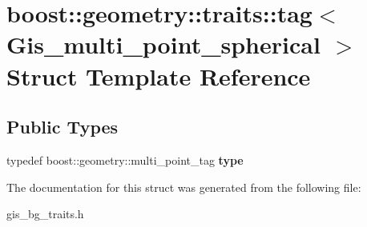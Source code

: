 \hypertarget{structboost_1_1geometry_1_1traits_1_1tag_3_01Gis__multi__point__spherical_01_4}{}\section{boost\+:\+:geometry\+:\+:traits\+:\+:tag$<$ Gis\+\_\+multi\+\_\+point\+\_\+spherical $>$ Struct Template Reference}
\label{structboost_1_1geometry_1_1traits_1_1tag_3_01Gis__multi__point__spherical_01_4}
\subsection*{Public Types}
\begin{DoxyCompactItemize}
\item 
\mbox{\label{structboost_1_1geometry_1_1traits_1_1tag_3_01Gis__multi__point__spherical_01_4_a4021efc2a09a1f7eb29fa6dc6380ee00}} 
typedef boost\+::geometry\+::multi\+\_\+point\+\_\+tag {\bfseries type}
\end{DoxyCompactItemize}


The documentation for this struct was generated from the following file\+:\begin{DoxyCompactItemize}
\item 
gis\+\_\+bg\+\_\+traits.\+h\end{DoxyCompactItemize}
